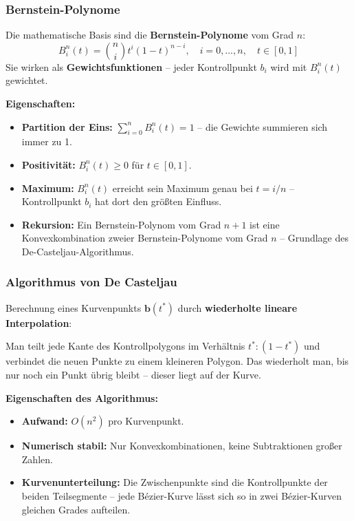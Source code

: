 \documentclass[12pt, a4paper]{article}
\begin{document}
\subsubsection*{Bernstein-Polynome}

Die mathematische Basis sind die \textbf{Bernstein-Polynome} vom Grad $n$:
\[
  B_i^n(t) = \binom{n}{i} t^i (1-t)^{n-i}, \quad i = 0, \dots, n,\quad t \in [0,1]
\]
Sie wirken als \textbf{Gewichtsfunktionen} -- jeder Kontrollpunkt $b_i$ wird mit $B_i^n(t)$ gewichtet.

\textbf{Eigenschaften:}
\begin{itemize}
  \item \textbf{Partition der Eins:} $\sum_{i=0}^{n} B_i^n(t) = 1$ -- die Gewichte summieren sich immer zu 1.
  \item \textbf{Positivität:} $B_i^n(t) \geq 0$ für $t \in [0,1]$.
  \item \textbf{Maximum:} $B_i^n(t)$ erreicht sein Maximum genau bei $t = i/n$ -- Kontrollpunkt $b_i$ hat dort den größten Einfluss.
  \item \textbf{Rekursion:} Ein Bernstein-Polynom vom Grad $n{+}1$ ist eine Konvexkombination zweier Bernstein-Polynome vom Grad $n$ -- Grundlage des De-Casteljau-Algorithmus.
\end{itemize}

\subsubsection*{Algorithmus von De Casteljau}

Berechnung eines Kurvenpunkts $\mathbf{b}(t^*)$ durch \textbf{wiederholte lineare Interpolation}:

Man teilt jede Kante des Kontrollpolygons im Verhältnis $t^* : (1-t^*)$ und verbindet die neuen Punkte zu einem kleineren Polygon. Das wiederholt man, bis nur noch ein Punkt übrig bleibt -- dieser liegt auf der Kurve.

\textbf{Eigenschaften des Algorithmus:}
\begin{itemize}
  \item \textbf{Aufwand:} $O(n^2)$ pro Kurvenpunkt.
  \item \textbf{Numerisch stabil:} Nur Konvexkombinationen, keine Subtraktionen großer Zahlen.
  \item \textbf{Kurvenunterteilung:} Die Zwischenpunkte sind die Kontrollpunkte der beiden Teilsegmente -- jede Bézier-Kurve lässt sich so in zwei Bézier-Kurven gleichen Grades aufteilen.
\end{itemize}
\end{document}

